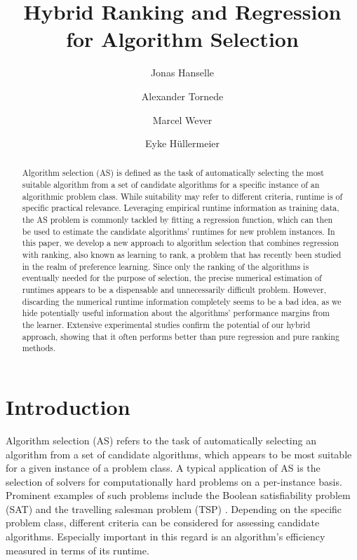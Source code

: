 \documentclass[runningheads]{llncs}
\begin{document}
\title{Hybrid Ranking and Regression\\ for Algorithm Selection}
\author{Jonas Hanselle \and
Alexander Tornede \and
Marcel Wever \and
Eyke Hüllermeier}
\maketitle              %

\begin{abstract}
Algorithm selection (AS) is defined as the task of automatically selecting the most suitable algorithm from a set of candidate algorithms for a specific instance of an algorithmic problem class. While suitability may refer to different criteria, runtime is of specific practical relevance. Leveraging empirical runtime information as training data, the AS problem is commonly tackled by fitting a regression function, which can then be used to estimate the candidate algorithms' runtimes for new problem instances. In this paper, we develop a new approach to algorithm selection that combines regression with ranking, also known as learning to rank, a problem that has recently been studied in the realm of preference learning. Since only the ranking of the algorithms is eventually needed for the purpose of selection, the precise numerical estimation of runtimes appears to be a dispensable and unnecessarily difficult problem. However, discarding the numerical runtime information completely seems to be a bad idea, as we hide potentially useful information about the algorithms' performance margins from the learner. Extensive experimental studies confirm the potential of our hybrid approach, showing that it often performs better than pure regression and pure ranking methods.   


\end{abstract}

\section{Introduction}
Algorithm selection (AS) refers to the task of automatically selecting an algorithm from a set of candidate algorithms, which appears to be most suitable for a given instance of a problem class. A typical application of AS is the selection of solvers for computationally hard problems on a per-instance basis. Prominent examples of such problems include the Boolean satisfiability problem (SAT) \cite{xu2008satzilla} and the travelling salesman problem (TSP) \cite{DBLP:conf/ictai/PiheraM14}.
Depending on the specific problem class, different criteria can be considered for assessing candidate algorithms. Especially important in this regard is an algorithm's efficiency measured in terms of its runtime.
\end{document}
